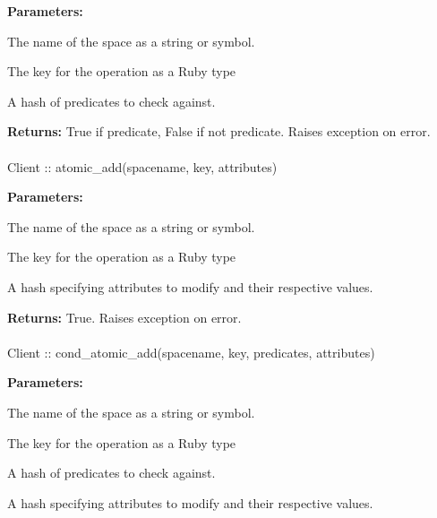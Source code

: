 \noindent\textbf{Parameters:}
\begin{description}[labelindent=\widthof{{\code{predicates}}},leftmargin=*,noitemsep,nolistsep,align=right]
\item[\code{spacename}] The name of the space as a string or symbol.
\item[\code{key}] The key for the operation as a Ruby type
\item[\code{predicates}] A hash of predicates to check against.
\end{description}

\noindent\textbf{Returns:}
True if predicate, False if not predicate.  Raises exception on error.

\paragraph{}
\label{api:ruby:atomic_add}
\begin{rubycode}
Client :: atomic_add(spacename, key, attributes)
\end{rubycode}


\noindent\textbf{Parameters:}
\begin{description}[labelindent=\widthof{{\code{attributes}}},leftmargin=*,noitemsep,nolistsep,align=right]
\item[\code{spacename}] The name of the space as a string or symbol.
\item[\code{key}] The key for the operation as a Ruby type
\item[\code{attributes}] A hash specifying attributes to modify and their respective values.
\end{description}

\noindent\textbf{Returns:}
True.  Raises exception on error.

\paragraph{}
\label{api:ruby:cond_atomic_add}
\begin{rubycode}
Client :: cond_atomic_add(spacename, key, predicates, attributes)
\end{rubycode}


\noindent\textbf{Parameters:}
\begin{description}[labelindent=\widthof{{\code{predicates}}},leftmargin=*,noitemsep,nolistsep,align=right]
\item[\code{spacename}] The name of the space as a string or symbol.
\item[\code{key}] The key for the operation as a Ruby type
\item[\code{predicates}] A hash of predicates to check against.
\item[\code{attributes}] A hash specifying attributes to modify and their respective values.
\end{description}

